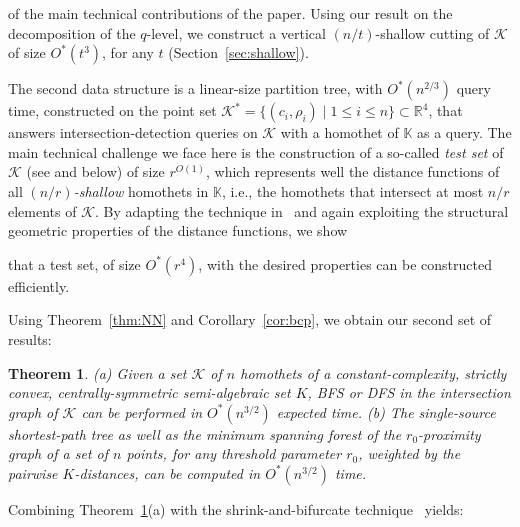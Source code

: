 \documentclass[11pt]{article}
\newif\iffullver
\def\reals{{\mathbb R}}
\def\Kspace{{\mathbb K}}
\def\K{\mathcal{K}}
\newtheorem{theorem}{Theorem}[section]
\theoremstyle{definition}
\begin{document}
of the main technical contributions of the paper. Using our result on the decomposition of the $q$-level,
we construct a vertical $(n/t)$-shallow 
cutting of $\K$ of size $O^*(t^3)$, for any $t$ (Section~\ref{sec:shallow}). 
\iffullver
We build a tree data structure using vertical shallow cuttings
and adapt the technique in~\cite{AM95} to handle efficient deletions of 
homothets from $\K$; as noted, insertions are handled using the standard Bentley-Saxe technique~\cite{BS80}.
\fi
%
The second data structure is a linear-size partition tree, with $O^*(n^{2/3})$ query time,
constructed on the point set $\K^* = \{ (c_i, \rho_i) \mid 1 \le i \le n\} \subset\reals^4$,
that answers intersection-detection queries on $\K$ with a homothet of 
$\Kspace$ as a query. The main 
technical challenge we face here is the construction of a so-called \emph{test set} of $\K$ 
(see \cite{ShSh} and below) of size $r^{O(1)}$, which represents well the distance functions of all 
\emph{$(n/r)$-shallow} homothets in $\Kspace$, i.e., the homothets that intersect 
at most $n/r$ elements of $\K$. By adapting the technique in~\cite{ShSh} and again exploiting 
the structural geometric properties of the distance functions, we show 
\iffullver
(in Section~\ref{subsec:linear}) 
\fi
that a test set, of size $O^*(r^4)$, with the desired properties can be constructed efficiently.
%
\iffullver
Using Theorem~\ref{thm:NN} and Corollary~\ref{cor:bcp}, we obtain our second set of results 
related to searching in the intersection and proximity graphs of $\K$.
\else
Using Theorem~\ref{thm:NN} and Corollary~\ref{cor:bcp}, we obtain our second set of results:
\fi
\begin{theorem} \label{thm:bfs}
(a) Given a set $\K$ of $n$ homothets of a constant-complexity, strictly convex, centrally-symmetric semi-algebraic set $K$,
BFS or DFS in the intersection graph of $\K$ can be performed in $O^*(n^{3/2})$ expected time. 
%
(b) The single-source shortest-path tree as well as the minimum spanning forest of the
$r_0$-proximity graph of a set of $n$ points, for any threshold parameter $r_0$, 
	weighted by the pairwise $K$-distances, can be computed in $O^*(n^{3/2})$ time.
\end{theorem}
%
Combining Theorem~\ref{thm:bfs}(a) with the shrink-and-bifurcate 
technique~\cite{BFKKS,KKSS} yields:
%
\end{document}
